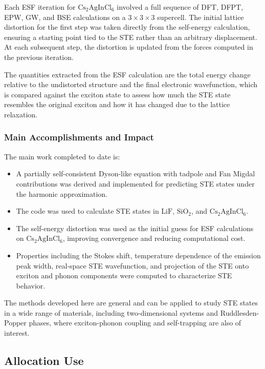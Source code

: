 \documentclass[11pt]{article}
\begin{document}
Each ESF iteration for \(\mathrm{Cs_2AgInCl_6}\) involved a full sequence of
DFT, DFPT, EPW, GW, and BSE calculations on a \(3\times3\times3\) supercell.
The initial lattice distortion for the first step was taken directly from the
self-energy calculation, ensuring a starting point tied to the STE rather than
an arbitrary displacement. At each subsequent step, the distortion is updated
from the forces computed in the previous iteration.

The quantities extracted from the ESF calculation are the total energy change
relative to the undistorted structure and the final electronic wavefunction,
which is compared against the exciton state to assess how much the STE state
resembles the original exciton and how it has changed due to the lattice
relaxation.

\subsubsection{Main Accomplishments and Impact}

The main work completed to date is:

\begin{itemize}
    \item A partially self-consistent Dyson-like equation with tadpole and Fan
        Migdal contributions was derived and implemented for predicting STE
        states under the harmonic approximation.
    \item The code was used to calculate STE states in \(\mathrm{LiF}\),
        \(\mathrm{SiO_2}\), and \(\mathrm{Cs_2AgInCl_6}\).
    \item The self-energy distortion was used as the initial guess for ESF
        calculations on \(\mathrm{Cs_2AgInCl_6}\), improving convergence
        and reducing computational cost.
    \item Properties including the Stokes shift, temperature dependence of the
        emission peak width, real-space STE wavefunction, and projection of the
        STE onto exciton and phonon components were computed to characterize
        STE behavior.
\end{itemize}

The methods developed here are general and can be applied to study STE states
in a wide range of materials, including two-dimensional systems and
Ruddlesden-Popper phases, where exciton-phonon coupling and self-trapping are
also of interest.

\subsection{Allocation Use}
\end{document}
